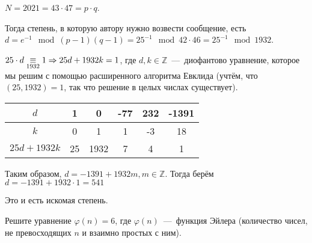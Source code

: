 \documentclass[a4paper,12pt]{article}
\begin{document}
\begin{solution}
	$N = 2021 = 43 \cdot 47 = p \cdot q$. 
	
	Тогда степень, в которую автору нужно возвести сообщение, есть $d = e^{-1} \mod (p-1)(q-1) = 25^{-1} \mod 42\cdot46 = 25^{-1} \mod 1932$.
	
	$25 \cdot d \underset{1932}{\equiv} 1 \Rightarrow 25d + 1932k = 1$, где $d, k\in \mathbb{Z}$~---~диофантово уравнение, которое мы решим с помощью расширенного алгоритма Евклида (учтём, что $(25, 1932) = 1$, так что решение в целых числах существует).
	
	\begin{tabular}{|c|c|c|c|c|c|}
		\hline
		$d$& 1 & 0 & -77 & 232 & -1391 \\
		\hline
		$k$& 0 & 1 & 1 & -3 & 18 \\
		\hline
		$25d+1932k$& 25 & 1932 & 7 & 4 & 1 \\
		\hline
	\end{tabular}
	
	\vspace{4mm}
	
	Таким образом, $d = -1391 + 1932m, m \in \mathbb{Z}$. Тогда берём $d = -1391 + 1932 \cdot 1 = 541$
	
	Это и есть искомая степень.
	
\end{solution}

\begin{task}
	Решите уравнение $\varphi(n) = 6$, где $\varphi(n)$~---~функция Эйлера (количество чисел, не превосходящих $n$ и взаимно простых с ним).
\end{task}
\end{document}

